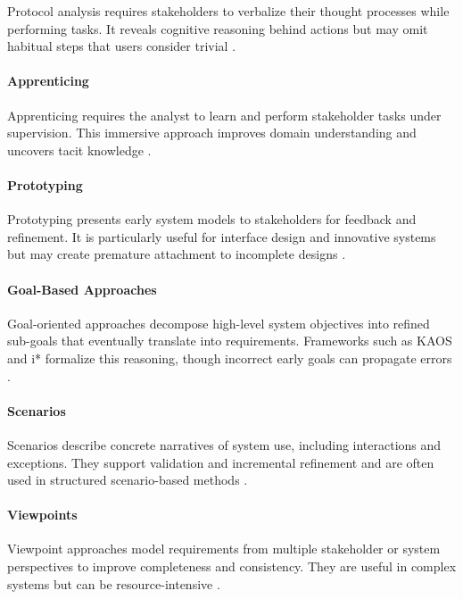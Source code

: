 Protocol analysis requires stakeholders to verbalize their thought processes while performing tasks. It reveals cognitive reasoning behind actions but may omit habitual steps that users consider trivial \cite{Nielsen2002}.

\paragraph{Apprenticing}

Apprenticing requires the analyst to learn and perform stakeholder tasks under supervision. This immersive approach improves domain understanding and uncovers tacit knowledge \cite{Beyer1995}.

\paragraph{Prototyping}

Prototyping presents early system models to stakeholders for feedback and refinement. It is particularly useful for interface design and innovative systems but may create premature attachment to incomplete designs \cite{Sommerville2001}.

\paragraph{Goal-Based Approaches}

Goal-oriented approaches decompose high-level system objectives into refined sub-goals that eventually translate into requirements. Frameworks such as KAOS and i* formalize this reasoning, though incorrect early goals can propagate errors \cite{Dardenne1993,Yu1997}.

\paragraph{Scenarios}

Scenarios describe concrete narratives of system use, including interactions and exceptions. They support validation and incremental refinement and are often used in structured scenario-based methods \cite{Potts1994,Rolland1998}.

\paragraph{Viewpoints}

Viewpoint approaches model requirements from multiple stakeholder or system perspectives to improve completeness and consistency. They are useful in complex systems but can be resource-intensive \cite{Sommerville1998,Nuseibeh1996}.


